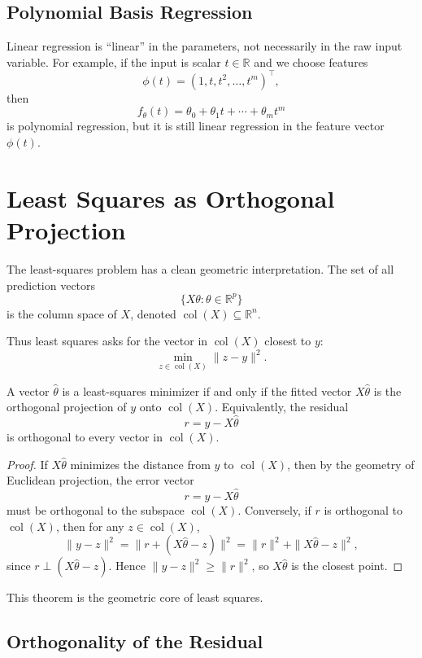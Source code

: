 \subsection{Polynomial Basis Regression}

Linear regression is ``linear'' in the parameters, not necessarily in the raw input variable. For example, if the input is scalar $t\in\mathbb R$ and we choose features
\[
\phi(t)=(1,t,t^2,\dots,t^m)^\top,
\]
then
\[
f_\theta(t)=\theta_0+\theta_1 t+\cdots+\theta_m t^m
\]
is polynomial regression, but it is still linear regression in the feature vector $\phi(t)$.

\section{Least Squares as Orthogonal Projection}

The least-squares problem has a clean geometric interpretation. The set of all prediction vectors
\[
\{X\theta:\theta\in\mathbb R^p\}
\]
is the column space of $X$, denoted $\operatorname{col}(X)\subseteq\mathbb R^n$.

Thus least squares asks for the vector in $\operatorname{col}(X)$ closest to $y$:
\[
\min_{z\in \operatorname{col}(X)} \|z-y\|^2.
\]

\begin{theorem}
A vector $\hat\theta$ is a least-squares minimizer if and only if the fitted vector $X\hat\theta$ is the orthogonal projection of $y$ onto $\operatorname{col}(X)$. Equivalently, the residual
\[
r=y-X\hat\theta
\]
is orthogonal to every vector in $\operatorname{col}(X)$.
\end{theorem}

\begin{proof}
If $X\hat\theta$ minimizes the distance from $y$ to $\operatorname{col}(X)$, then by the geometry of Euclidean projection, the error vector
\[
r=y-X\hat\theta
\]
must be orthogonal to the subspace $\operatorname{col}(X)$. Conversely, if $r$ is orthogonal to $\operatorname{col}(X)$, then for any $z\in\operatorname{col}(X)$,
\[
\|y-z\|^2=\|r+(X\hat\theta-z)\|^2
=\|r\|^2+\|X\hat\theta-z\|^2,
\]
since $r\perp (X\hat\theta-z)$. Hence $\|y-z\|^2\ge \|r\|^2$, so $X\hat\theta$ is the closest point.
\end{proof}

This theorem is the geometric core of least squares.

\subsection{Orthogonality of the Residual}


